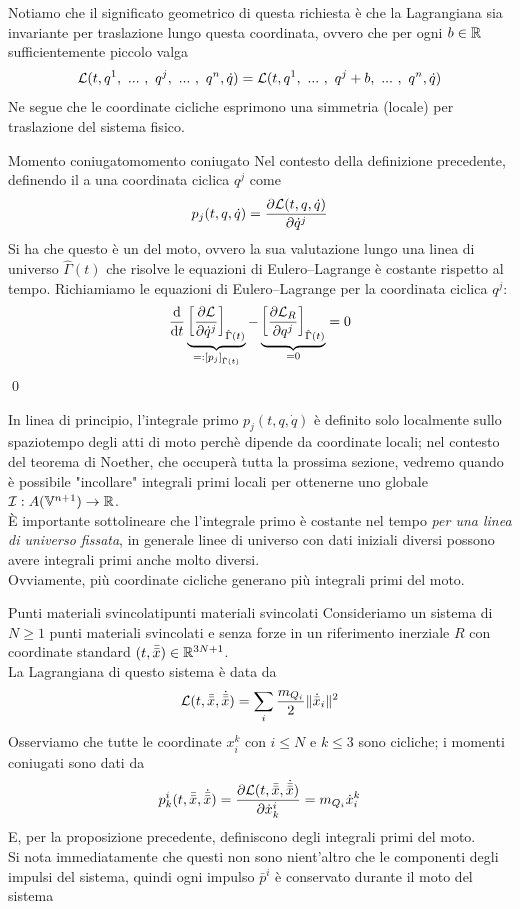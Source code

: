 \documentclass[openany]{book}
\renewcommand\V{\mathbb{V}}
\begin{document}
Notiamo che il significato geometrico di questa richiesta è che la Lagrangiana sia invariante per traslazione lungo questa coordinata, ovvero che per ogni $b\in\mathbb{R}$ sufficientemente piccolo valga
\[\L(t,q^1,\ ...\ ,\ q^j,\ ...\ ,\ q^n,\dot q) = \L(t,q^1,\ ...\ ,\ q^j+b,\ ...\ ,\ q^n,\dot q)\]
Ne segue che le coordinate cicliche esprimono una simmetria (locale) per traslazione del sistema fisico.

\begin{proposition}{Momento coniugato}{momento coniugato}
    Nel contesto della definizione precedente, definendo il  a una coordinata ciclica $q^j$ come 
    \[ p_j(t,q,\dot q) = \frac{\partial \mathcal{L}(t,q,\dot q)}{\partial \dot q^j} \]
    Si ha che questo è un  del moto, ovvero la sua valutazione lungo una linea di universo $\hat\Gamma(t)$ che risolve le equazioni di Eulero--Lagrange è costante rispetto al tempo.
    \proof 
    Richiamiamo le equazioni di Eulero--Lagrange per la coordinata ciclica $q^j$:
    \[ \frac{\text{d}}{\text{d} t} \underbrace{\left[ \frac{\partial \mathcal{L}}{\partial \dot q^j} \right]_{\hat\Gamma(t)}}_{=: [p_j]_{\hat\Gamma(t)}} - \underbrace{\left[ \frac{\partial \mathcal{L}_R}{\partial q^j} \right]_{\hat\Gamma(t)}}_{= 0} = 0\] 
    \qed
\end{proposition}

In linea di principio, l'integrale primo $p_j(t,q,\dot q)$ è definito solo localmente sullo spaziotempo degli atti di moto perchè dipende da coordinate locali; nel contesto del teorema di Noether, che occuperà tutta la prossima sezione, vedremo quando è possibile "incollare" integrali primi locali per ottenerne uno globale $\I : A(\V^{n+1})\to\R$.\\
È importante sottolineare che l'integrale primo è costante nel tempo \textit{per una linea di universo fissata}, in generale linee di universo con dati iniziali diversi possono avere integrali primi anche molto diversi.\\
Ovviamente, più coordinate cicliche generano più integrali primi del moto.

\begin{example}{Punti materiali svincolati}{punti materiali svincolati}
    Consideriamo un sistema di $N\ge 1$ punti materiali svincolati e senza forze in un riferimento inerziale $R$ con coordinate standard $(t,\bar{\bar x}) \in \mathbb{R}^{3N+1}$.\\
    La Lagrangiana di questo sistema è data da
    \[ \mathcal{L}(t,\bar{\bar x},\dot{\bar{\bar x}})  = \sum_i \frac{m_{Q_i}}{2}\| \dot{\bar x}_i \|^2\]
    Osserviamo che tutte le coordinate $x_i^k$ con $i \le N$ e $k\le 3$ sono cicliche; i momenti coniugati sono dati da
    \[ p_k^i(t,\bar{\bar x}, \dot{\bar{\bar x}}) = \frac{\partial \mathcal{L}(t,\bar{\bar x},\dot{\bar{\bar x}})}{\partial \dot x_k^i} = m_{Q_i}\dot x_i^k \]
    E, per la proposizione precedente, definiscono degli integrali primi del moto.\\
    Si nota immediatamente che questi non sono nient'altro che le componenti degli impulsi del sistema, quindi ogni impulso $\bar p^i$ è conservato durante il moto del sistema
\end{example}
\end{document}
